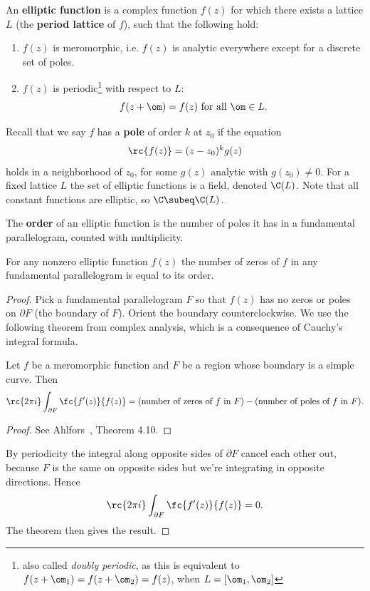 \begin{df}
An \textbf{elliptic function} is a complex function $f(z)$ for which there exists a lattice $L$ (the \textbf{period lattice} of $f$), such that the following hold:
\begin{enumerate}
\item
$f(z)$ is meromorphic, i.e. $f(z)$ is analytic everywhere
except for a discrete set of poles.
\item
$f(z)$ is periodic\footnote{also called {\it doubly periodic}, as this is equivalent to $f(z+\om_1)=f(z+\om_2)=f(z)$, when $L=[\om_1,\om_2]$} with respect to $L$:
\[
f(z+\om)=f(z)\text{ for all }\om\in L.
\]
\end{enumerate}
\end{df}
Recall that we say $f$ has a \textbf{pole} of order $k$ at $z_0$ if the equation
\[
\rc{f(z)}=(z-z_0)^kg(z)
\]
holds in a neighborhood of $z_0$, for some $g(z)$ analytic with $g(z_0)\ne 0$. 
For a fixed lattice $L$ the set of elliptic functions is a field, denoted $\C(L)$. Note that all constant functions are elliptic, so $\C\subeq \C(L)$.

\begin{df}
The \textbf{order} of an elliptic function is the number of poles it has in a fundamental parallelogram, counted with multiplicity.
\end{df}
\begin{thm}\label{thm:elliptic-order}
For any nonzero elliptic function $f(z)$ the number of zeros of $f$ in any fundamental parallelogram is equal to its order.
\end{thm}
\begin{proof}
Pick a fundamental parallelogram $F$ so that $f(z)$ has no zeros or poles on $\partial F$ (the boundary of $F$). Orient the boundary counterclockwise. We use the following theorem from complex analysis, which is a consequence of Cauchy's integral formula.
\begin{thm}
Let $f$ be a meromorphic function and $F$ be a region whose boundary is a simple curve. Then
\[
\rc{2\pi i}\int_{\partial F} \fc{f'(z)}{f(z)}=\text{(number of zeros of $f$ in $F$)}-\text{(number of poles of $f$ in $F$)}.
\]
\end{thm}
\begin{proof}
See Ahlfors~\cite{Ah79}, Theorem 4.10.
\end{proof}
By periodicity the integral along opposite sides of $\partial F$ cancel each other out, because $F$ is the same on opposite sides but we're integrating in opposite directions.
Hence
\[
\rc{2\pi i}\int_{\partial F} \fc{f'(z)}{f(z)}=0.
\]
The theorem then gives the result.
\end{proof}

